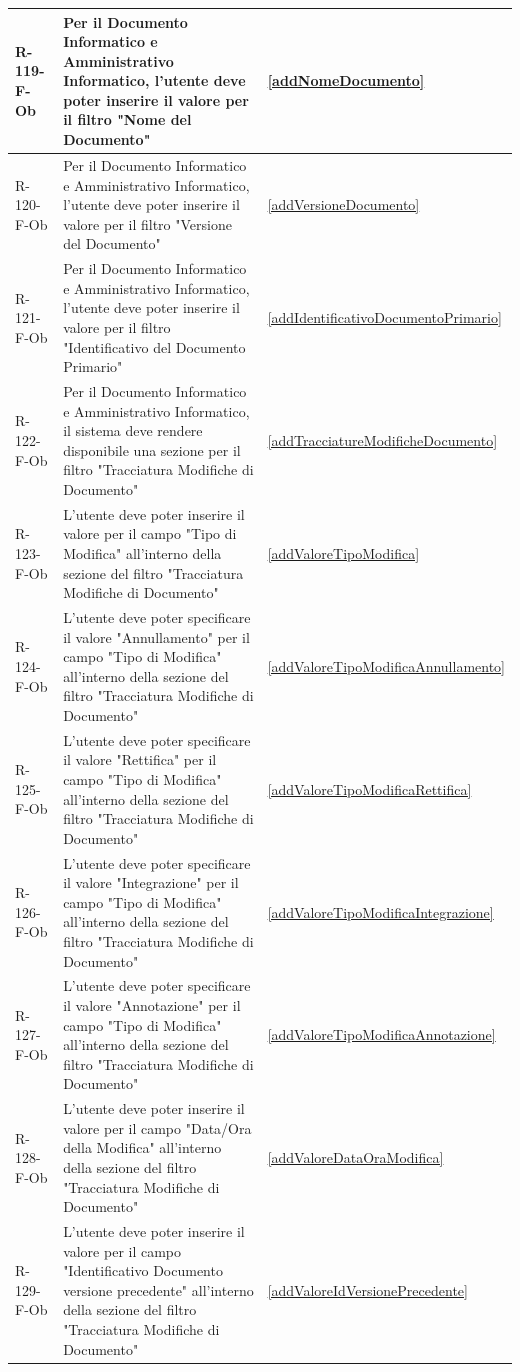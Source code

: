 \begin{longtable}{|p{2.5cm}|p{9.5cm}|p{2.5cm}|}
R-119-F-Ob & Per il Documento Informatico e Amministrativo Informatico, l'utente deve poter inserire il valore per il filtro "Nome del Documento" & \ref{addNomeDocumento} \\
\hline
R-120-F-Ob & Per il Documento Informatico e Amministrativo Informatico, l'utente deve poter inserire il valore per il filtro "Versione del Documento" & \ref{addVersioneDocumento} \\
\hline
R-121-F-Ob & Per il Documento Informatico e Amministrativo Informatico, l'utente deve poter inserire il valore per il filtro "Identificativo del Documento Primario" & \ref{addIdentificativoDocumentoPrimario} \\
\hline
R-122-F-Ob & Per il Documento Informatico e Amministrativo Informatico, il sistema deve rendere disponibile una sezione per il filtro "Tracciatura Modifiche di Documento" & \ref{addTracciatureModificheDocumento} \\
\hline
R-123-F-Ob & L'utente deve poter inserire il valore per il campo "Tipo di Modifica" all'interno della sezione del filtro "Tracciatura Modifiche di Documento" & \ref{addValoreTipoModifica} \\
\hline
R-124-F-Ob & L'utente deve poter specificare il valore "Annullamento" per il campo "Tipo di Modifica" all'interno della sezione del filtro "Tracciatura Modifiche di Documento" & \ref{addValoreTipoModificaAnnullamento} \\
\hline
R-125-F-Ob & L'utente deve poter specificare il valore "Rettifica" per il campo "Tipo di Modifica" all'interno della sezione del filtro "Tracciatura Modifiche di Documento" & \ref{addValoreTipoModificaRettifica} \\
\hline
R-126-F-Ob & L'utente deve poter specificare il valore "Integrazione" per il campo "Tipo di Modifica" all'interno della sezione del filtro "Tracciatura Modifiche di Documento" & \ref{addValoreTipoModificaIntegrazione} \\
\hline
R-127-F-Ob & L'utente deve poter specificare il valore "Annotazione" per il campo "Tipo di Modifica" all'interno della sezione del filtro "Tracciatura Modifiche di Documento" & \ref{addValoreTipoModificaAnnotazione} \\
\hline
R-128-F-Ob & L'utente deve poter inserire il valore per il campo "Data/Ora della Modifica" all'interno della sezione del filtro "Tracciatura Modifiche di Documento" & \ref{addValoreDataOraModifica} \\
\hline
R-129-F-Ob & L'utente deve poter inserire il valore per il campo "Identificativo Documento versione precedente" all'interno della sezione del filtro "Tracciatura Modifiche di Documento" & \ref{addValoreIdVersionePrecedente} \\
\hline


\end{longtable}
